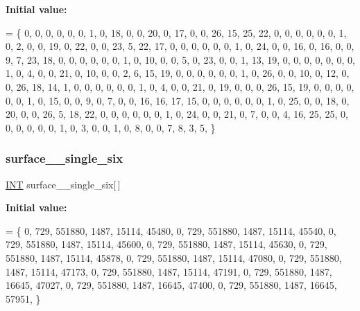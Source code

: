 {\bfseries Initial value\+:}
\begin{DoxyCode}
= \{
    0, 0, 0, 0, 0, 0, 1, 0, 18, 0, 0, 20, 0, 17, 0, 0, 26, 15, 25, 22, 
    0, 0, 0, 0, 0, 0, 1, 0, 2, 0, 0, 19, 0, 22, 0, 0, 23, 5, 22, 17, 
    0, 0, 0, 0, 0, 0, 1, 0, 24, 0, 0, 16, 0, 16, 0, 0, 9, 7, 23, 18, 
    0, 0, 0, 0, 0, 0, 1, 0, 10, 0, 0, 5, 0, 23, 0, 0, 1, 13, 19, 0, 
    0, 0, 0, 0, 0, 0, 1, 0, 4, 0, 0, 21, 0, 10, 0, 0, 2, 6, 15, 19, 
    0, 0, 0, 0, 0, 0, 1, 0, 26, 0, 0, 10, 0, 12, 0, 0, 26, 18, 14, 1, 
    0, 0, 0, 0, 0, 0, 1, 0, 4, 0, 0, 21, 0, 19, 0, 0, 0, 26, 15, 19, 
    0, 0, 0, 0, 0, 0, 1, 0, 15, 0, 0, 9, 0, 7, 0, 0, 16, 16, 17, 15, 
    0, 0, 0, 0, 0, 0, 1, 0, 25, 0, 0, 18, 0, 20, 0, 0, 26, 5, 18, 22, 
    0, 0, 0, 0, 0, 0, 1, 0, 24, 0, 0, 21, 0, 7, 0, 0, 4, 16, 25, 25, 
    0, 0, 0, 0, 0, 0, 1, 0, 3, 0, 0, 1, 0, 8, 0, 0, 7, 8, 3, 5, 
\}
\end{DoxyCode}
\mbox{\label{surface__27_8_c_a09501ffc959259396efff23369b69614}} 
\subsubsection{\texorpdfstring{surface\+\_\+\_\+single\+\_\+six}{surface\_27\_single\_six}}
{\footnotesize\ttfamily \mbox{\hyperlink{galois_8h_a09fddde158a3a20bd2dcadb609de11dc}{I\+NT}} surface\+\_\+\_\+single\+\_\+six\mbox{[}$\,$\mbox{]}}

{\bfseries Initial value\+:}
\begin{DoxyCode}
= \{ 
    0, 729, 551880, 1487, 15114, 45480, 
    0, 729, 551880, 1487, 15114, 45540, 
    0, 729, 551880, 1487, 15114, 45600, 
    0, 729, 551880, 1487, 15114, 45630, 
    0, 729, 551880, 1487, 15114, 45878, 
    0, 729, 551880, 1487, 15114, 47080, 
    0, 729, 551880, 1487, 15114, 47173, 
    0, 729, 551880, 1487, 15114, 47191, 
    0, 729, 551880, 1487, 16645, 47027, 
    0, 729, 551880, 1487, 16645, 47400, 
    0, 729, 551880, 1487, 16645, 57951, 
\}
\end{DoxyCode}
\mbox{\label{surface__27_8_c_aaab76b3a0d22a0cd5ff0ea75086a3d36}} 
